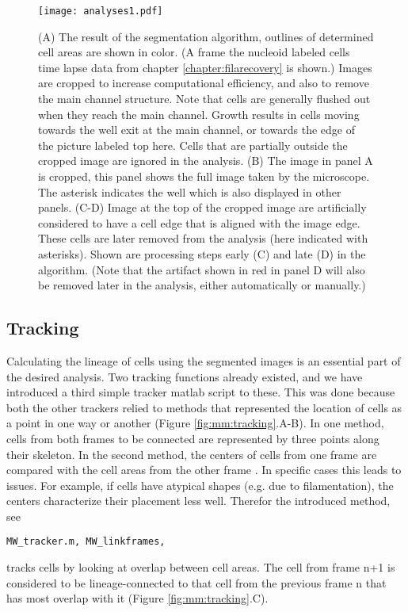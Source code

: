 \begin{figure}
	\centering
	\texttt{[image: analyses1.pdf]}
	\caption{ 
		 (A) The result of the segmentation algorithm, outlines of determined cell areas are shown in color.  (A frame the nucleoid labeled cells time lapse data from chapter \ref{chapter:filarecovery} is shown.) Images are cropped to increase computational efficiency, and also to remove the main channel structure. Note that cells are generally flushed out when they reach the main channel. Growth results in cells moving towards the well exit at the main channel, or towards the edge of the picture labeled top here. Cells that are partially outside the cropped image are ignored in the analysis.
		 (B) The image in panel A is cropped, this panel shows the full image taken by the microscope. The asterisk indicates the well which is also displayed in other panels.
		 (C-D) Image at the top of the cropped image are artificially considered to have a cell edge that is aligned with the image edge. These cells are later removed from the analysis (here indicated with asterisks). Shown are processing steps early (C) and late (D) in the algorithm. (Note that the artifact shown in red in panel D will also be removed later in the analysis, either automatically or manually.)
	}
	\label{fig:mm:segmentation}
\end{figure}

\subsection{Tracking}

Calculating the lineage of cells using the segmented images is an essential part of the desired analysis.
Two tracking functions already existed, and we have introduced a third simple tracker matlab script to these.
%
This was done because both the other trackers relied to methods that represented the location of cells as a point in one way or another (Figure \ref{fig:mm:tracking}.A-B).
In one method, cells from both frames to be connected are represented by three points along their skeleton.
In the second method, the centers of cells from one frame are compared with the cell areas from the other frame \cite{Walker2016t}.
%
In specific cases this leads to issues. For example, if cells have atypical shapes (e.g. due to filamentation), the centers characterize their placement less well.
Therefor the introduced method, see
\begin{verbatim}
MW_tracker.m, MW_linkframes, 
\end{verbatim}
tracks cells by looking at overlap between cell areas.
The cell from frame n+1 is considered to be lineage-connected to that cell from the previous frame n that has most overlap with it (Figure \ref{fig:mm:tracking}.C).

